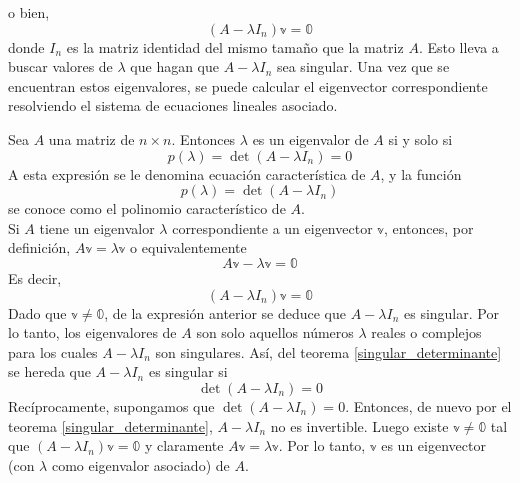 \noindent o bien,
$$(A - \lambda I_n) \mathbb{v} = \mathbb{0}$$
donde $I_n$ es la matriz identidad del mismo tamaño que la matriz $A$. Esto lleva a buscar valores de $\lambda$ que hagan que $A - \lambda I_n$ sea singular. Una vez que se encuentran estos eigenvalores, se puede calcular el eigenvector correspondiente resolviendo el sistema de ecuaciones lineales asociado.

\begin{theorem}
    Sea $A$ una matriz de $n \times n$. Entonces $\lambda$ es un eigenvalor de $A$ si y solo si
    $$p(\lambda) = \det(A - \lambda I_n) = 0$$
    A esta expresión se le denomina ecuación característica de $A$, y la función
    $$p(\lambda) = \det(A - \lambda I_n)$$
    se conoce como el polinomio característico de $A$. \\
    \demostracion Si $A$ tiene un eigenvalor $\lambda$ correspondiente a un eigenvector $\mathbb{v}$, entonces, por definición, $A \mathbb{v} = \lambda \mathbb{v}$ o equivalentemente
    $$A \mathbb{v} - \lambda \mathbb{v} = \mathbb{0}$$
    Es decir,
    $$(A - \lambda I_n) \mathbb{v} = \mathbb{0}$$
    Dado que $\mathbb{v} \neq \mathbb{0}$, de la expresión anterior se deduce que $A - \lambda I_n$ es singular. Por lo tanto, los eigenvalores de $A$ son solo aquellos números $\lambda$ reales o complejos para los cuales $A - \lambda I_n$ son singulares. Así, del teorema \ref{singular_determinante} se hereda que $A - \lambda I_n$ es singular si
    $$\det(A - \lambda I_n) = 0$$
    Recíprocamente, supongamos que $\det(A - \lambda I_n) = 0$. Entonces, de nuevo por el teorema \ref{singular_determinante}, $A - \lambda I_n$ no es invertible. Luego existe $\mathbb{v} \neq \mathbb{0}$ tal que $(A - \lambda I_n) \mathbb{v} = \mathbb{0}$ y claramente $A \mathbb{v} = \lambda \mathbb{v}$. Por lo tanto, $\mathbb{v}$ es un eigenvector (con $\lambda$ como eigenvalor asociado) de $A$.
\end{theorem}

